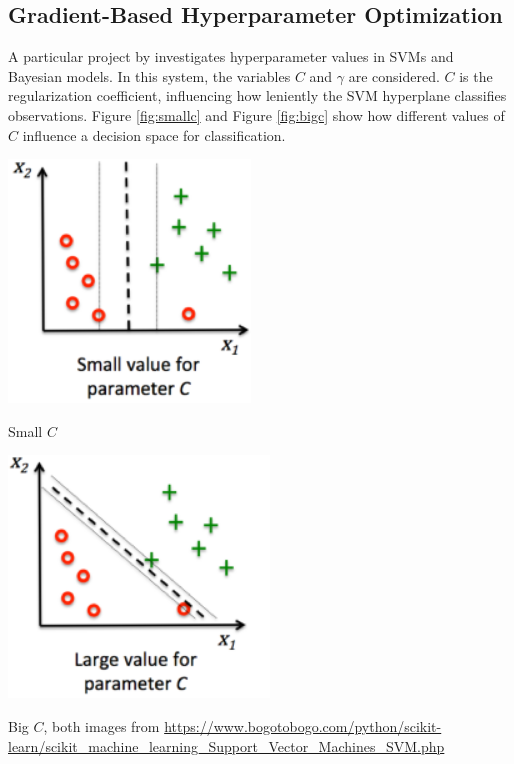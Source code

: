 \subsection{Gradient-Based Hyperparameter Optimization}
\label{sec:gradient-based-optimization}
A particular project by \cite{SathiyaKeerthi2006} investigates hyperparameter values in SVMs and Bayesian models. In this system, the variables $C$ and $\gamma$ are considered. $C$ is the regularization coefficient, influencing how leniently the SVM hyperplane classifies observations. Figure \ref{fig:smallc} and Figure \ref{fig:bigc} show how different values of $C$ influence a decision space for classification.

\begin{marginfigure}%
	\centering
	\includegraphics[width=0.8\linewidth]{graphics/hyperparameters/Small_C.png}
	\caption{Small $C$}
	\label{fig:smallc}
\end{marginfigure}
\begin{marginfigure}%
	\centering
	\includegraphics[width=0.8\linewidth]{graphics/hyperparameters/Big_C.png}
	\caption{Big $C$, both images from \url{https://www.bogotobogo.com/python/scikit-learn/scikit_machine_learning_Support_Vector_Machines_SVM.php}}
	\label{fig:bigc}
\end{marginfigure}

